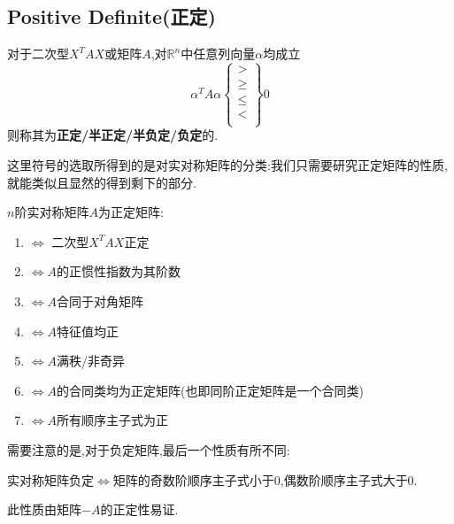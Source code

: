 \documentclass[UTF8,a4paper,notitlepage]{book}
\begin{document}
        \subsection{Positive Definite(正定)}
        \begin{definition}\mbox{}
            对于二次型$X^TAX$或矩阵$A$,对$\mathbb{R}^n$中任意列向量$\alpha$均成立$$\alpha^TA\alpha\left\{\begin{array}{c}>\\ \geq \\ \leq \\ <\\ \end{array}\right\}0$$
                则称其为\textbf{正定/半正定/半负定/负定}的.
        \end{definition}
        这里符号的选取所得到的是对实对称矩阵的分类:我们只需要研究正定矩阵的性质,就能类似且显然的得到剩下的部分.
        \begin{property}[正定矩阵的性质]
            $n$阶实对称矩阵$A$为正定矩阵:
            \begin{enumerate}
            \item $\Leftrightarrow $ 二次型$X^TAX$正定
            \item $\Leftrightarrow A $的正惯性指数为其阶数
            \item $\Leftrightarrow A $合同于对角矩阵
            \item $\Leftrightarrow A $特征值均正
            \item $\Leftrightarrow A $满秩/非奇异
            \item $\Leftrightarrow A $的合同类均为正定矩阵(也即同阶正定矩阵是一个合同类)
            \item $\Leftrightarrow A $所有顺序主子式为正
        \end{enumerate} \end{property}
        需要注意的是,对于负定矩阵,最后一个性质有所不同:
        \begin{property}
            实对称矩阵负定$\Leftrightarrow$矩阵的奇数阶顺序主子式小于0,偶数阶顺序主子式大于0.
        \end{property}
        此性质由矩阵$-A$的正定性易证.
\end{document}
